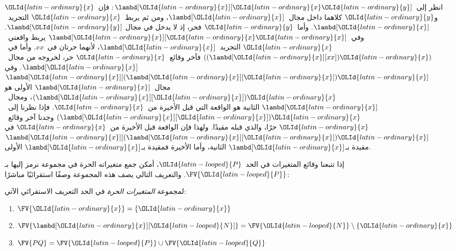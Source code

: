 \documentclass[../../../include/open-logic-section]{subfiles}
\begin{document}
\begin{ex}
  انظر إلى~$\lambd[\OLId{latin-ordinary}{x}][\OLId{latin-ordinary}{x} \OLId{latin-ordinary}{y}]$: فإن~$\OLId{latin-ordinary}{x}$ و$\OLId{latin-ordinary}{y}$ كلاهما داخل مجال~$\lambd[\OLId{latin-ordinary}{x}]$،
  ومن ثم يربط~$\OLId{latin-ordinary}{x}$ التجريد~$\lambd[\OLId{latin-ordinary}{x}]$. وأما~$\OLId{latin-ordinary}{y}$ فحر، إذ لا يدخل في مجال
  $\lambd[\OLId{latin-ordinary}{y}]$. وفي~$\lambd[\OLId{latin-ordinary}{x}][\OLId{latin-ordinary}{x} \OLId{latin-ordinary}{x}]$ يربط واقعتي~$\OLId{latin-ordinary}{x}$ التجريد~$\lambd[\OLId{latin-ordinary}{x}]$،
  لأنهما حرتان في~$xx$. وأما في~$((\lambd[\OLId{latin-ordinary}{x}][xx])\OLId{latin-ordinary}{x})$ فآخر وقائع~$\OLId{latin-ordinary}{x}$ حر،
  لخروجه من مجال~$\lambd[\OLId{latin-ordinary}{x}]$. وفي
  $\lambd[\OLId{latin-ordinary}{x}][(\lambd[\OLId{latin-ordinary}{x}][\OLId{latin-ordinary}{x}])\OLId{latin-ordinary}{x}]$ مجال~$\lambd[\OLId{latin-ordinary}{x}]$ الأولى هو
  $(\lambd[\OLId{latin-ordinary}{x}][\OLId{latin-ordinary}{x}])\OLId{latin-ordinary}{x}$، ومجال~$\lambd[\OLId{latin-ordinary}{x}]$ الثانية هو الواقعة التي قبل الأخيرة
  من~$\OLId{latin-ordinary}{x}$. فإذا نظرنا إلى~$(\lambd[\OLId{latin-ordinary}{x}][\OLId{latin-ordinary}{x}])\OLId{latin-ordinary}{x}$ وجدنا آخر وقائع~$\OLId{latin-ordinary}{x}$ حرًا،
  والذي قبله مقيدًا. ولهذا فإن الواقعة قبل الأخيرة من~$\OLId{latin-ordinary}{x}$ في
  $\lambd[\OLId{latin-ordinary}{x}][(\lambd[\OLId{latin-ordinary}{x}][\OLId{latin-ordinary}{x}])\OLId{latin-ordinary}{x}]$ مقيدة بـ$\lambd[\OLId{latin-ordinary}{x}]$ الثانية، وأما الأخيرة فمقيدة بـ$\lambd[\OLId{latin-ordinary}{x}]$ الأولى.
\end{ex}

إذا تتبعنا وقائع المتغيرات في الحد~$\OLId{latin-looped}{P}$، أمكن جمع متغيراته الحرة في مجموعة نرمز إليها بـ$\FV{\OLId{latin-looped}{P}}$.
والتعريف التالي يصف هذه المجموعة وصفًا استقرائيًا مباشرًا:

\begin{defn} 
  لمجموعة \emph{المتغيرات الحرة} في الحد التعريف الاستقرائي الآتي:
  \begin{enumerate}
    \item $\FV{\OLId{latin-ordinary}{x}} = \{\OLId{latin-ordinary}{x}\}$ 
    \item $\FV{\lambd[\OLId{latin-ordinary}{x}][\OLId{latin-looped}{N}]} = \FV{\OLId{latin-looped}{N}} \setminus \{\OLId{latin-ordinary}{x}\}$    
    \item $\FV{PQ} = \FV{\OLId{latin-looped}{P}} \cup \FV{\OLId{latin-looped}{Q}}$ 
  \end{enumerate}
\end{defn}
\end{document}
